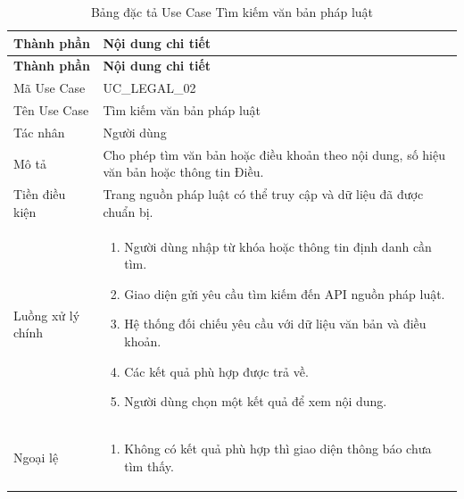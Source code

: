 \documentclass[12pt,a4paper,oneside]{report}
\begin{document}
{
  \begin{longtable}{|L{3.6cm}|L{11.2cm}|}
    \caption{Bảng đặc tả Use Case Tìm kiếm văn bản pháp luật}\label{tab:uc-legal-search}                          \\
    \hline
    \textbf{Thành phần} & \textbf{Nội dung chi tiết}                                                                \\
    \hline
    \endfirsthead
    \hline
    \textbf{Thành phần} & \textbf{Nội dung chi tiết}                                                                \\
    \hline
    \endhead
    Mã Use Case       & UC\_LEGAL\_02                                                                             \\
    \hline
    Tên Use Case      & Tìm kiếm văn bản pháp luật                                                                \\
    \hline
    Tác nhân            & Người dùng                                                                                \\
    \hline
    Mô tả               & Cho phép tìm văn bản hoặc điều khoản theo nội dung, số hiệu văn bản hoặc thông tin Điều.  \\
    \hline
    Tiền điều kiện      & Trang nguồn pháp luật có thể truy cập và dữ liệu đã được chuẩn bị.                        \\
    \hline
    Luồng xử lý chính   & \begin{enumerate}[leftmargin=*,nosep]
                            \item Người dùng nhập từ khóa hoặc thông tin định danh cần tìm.
                            \item Giao diện gửi yêu cầu tìm kiếm đến API nguồn pháp luật.
                            \item Hệ thống đối chiếu yêu cầu với dữ liệu văn bản và điều khoản.
                            \item Các kết quả phù hợp được trả về.
                            \item Người dùng chọn một kết quả để xem nội dung.
                          \end{enumerate}                        \\
    \hline
    Ngoại lệ            & \begin{enumerate}[leftmargin=*,nosep]
                            \item Không có kết quả phù hợp thì giao diện thông báo chưa tìm thấy.

\end{enumerate}
\end{longtable}}
\end{document}
